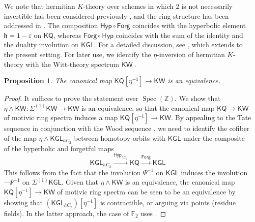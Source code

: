 \documentclass[11pt,hyp,english]{article}
\newcommand{\Z}{\mathbb{Z}}
\newcommand{\KGL}{\mathsf{KGL}}
\newcommand{\KQ}{\mathsf{KQ}}
\newcommand{\KW}{\mathsf{KW}}
\newcommand{\Spec}{\operatorname{Spec}}
\newcommand{\Forg}{\mathsf{Forg}}
\newcommand{\Hyper}{\mathsf{Hyp}}
\let\smash=\wedge
\newtheorem{theorem}{Theorem}[section]
\newtheorem{proposition}[theorem]{Proposition}
\theoremstyle{definition}
\begin{document}
We note that hermitian $K$-theory over schemes in which $2$ is not necessarily invertible has been considered previously \cite{schlichting,spitzweck.herm}, and the ring structure has been addressed in \cite{lopez.thesis}. The composition $\Hyper\circ \Forg$ coincides with the hyperbolic element $\mathsf{h}=1-\varepsilon$ on $\KQ$, whereas $\Forg \circ \Hyper$ coincides with the sum of the identity and the duality involution on $\KGL$. For a detailed discussion, see \cite[Section 3]{RO:slices}, which extends to the present setting.
For later use, we identify the $\eta$-inversion of hermitian $K$-theory with the Witt-theory spectrum $\KW$ \cite[Definition 8.1.1]{chn}.


\begin{proposition}
\label{prop.KQetaisKW}
The canonical map $\KQ[\eta^{-1}]\to \KW$ is an equivalence.
\end{proposition}
\begin{proof}
It suffices to prove the statement over $\Spec(\Z)$. 
We show that $\eta\smash \KW\colon \Sigma^{(1)}\KW\to \KW$ is an equivalence, 
so that the canonical map $\KQ \to \KW$ of motivic ring spectra induces a map $\KQ[\eta^{-1}]\to \KW$.
By appealing to the 
Tate sequence \cite[Corollary 8.1.6]{chn} in conjunction with the Wood sequence \cite[Corollary 8.1.7]{chn}, 
we need to identify the cofiber of the map $\eta\smash \KGL_{hC_2}$ between homotopy orbits with $\KGL$ 
under the composite of the hyperbolic and forgetful maps
\[
\KGL_{hC_2}\xrightarrow{\Hyper_{hC_2}} \KQ \xrightarrow{\Forg} \KGL
\]
This follows from the fact that the involution $\Psi^{-1}$ on $\KGL$ induces the involution $-\Psi^{-1}$ on $\Sigma^{(1)}\KGL$.
Given that $\eta\smash \KW$ is an equivalence, 
the canonical map $\KQ[\eta^{-1}]\to \KW$ of motivic ring spectra can be seen to be an equivalence 
by showing that $(\KGL_{hC_2})[\eta^{-1}]$ is contractible, or arguing via points (residue fields).
In the latter approach, 
the case of $\mathbb{F}_2$ uses \cite{chn}.
\end{proof}


\end{document}
